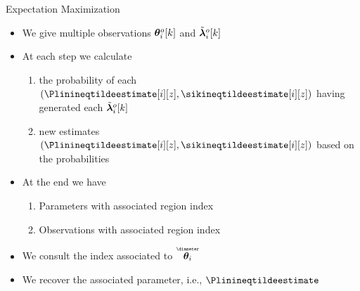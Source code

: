 \documentclass[handout,aspectratio=169]{beamer}
\begin{document}
\begin{frame}{Expectation Maximization}

  \begin{itemize}[<+(1)->]
    \item We give multiple observations $\boldsymbol{\theta}_{i}^{o}[k]$ and $\tilde{\boldsymbol{\lambda}}_{i}^{o}[k]$
    \item At each step we calculate
          \begin{enumerate}
            \item[\encircle{E}] the probability of each $(\Plinineqtildeestimate[i][z],\sikineqtildeestimate[i][z])$ having generated each $\tilde{\boldsymbol{\lambda}}_{i}^{o}[k]$
            \item[\encircle{M}] new estimates $(\Plinineqtildeestimate[i][z],\sikineqtildeestimate[i][z])$ based on the probabilities
          \end{enumerate}
  \end{itemize}

  \begin{itemize}[<+(1)->]
    \item At the end we have
          \begin{enumerate}
            \item Parameters with associated region index
            \item Observations with associated region index
          \end{enumerate}
    \item We consult the index associated to $\thetairestricted$
    \item We recover the associated parameter, i.e., $\Plinineqtildeestimate$
  \end{itemize}
\end{frame}
\end{document}
